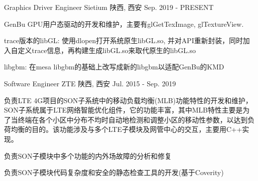 
\begin{cventries}
  \cventry
    {Graphics Driver Engineer} %
    {Sietium} %
    {陕西, 西安} %
    {Sep. 2019 - PRESENT} %
    {
      \begin{cvitems} %
        \item {GenBu GPU用户态驱动的开发和维护，主要有glGetTexImage, glTextureView.}
        \item {trace版本的libGL: 使用dlopen打开系统原生libGL.so, 并对API重新封装，同时加入自定义trace信息，再构建生成libGL.so来取代原生的libGL.so}
        \item {libgbm: 在mesa libgbm的基础上改写成新的libgbm以适配GenBu的KMD}
      \end{cvitems}
    }

  \cventry
    {Software Engineer} %
    {ZTE} %
    {陕西, 西安} %
    {Jul. 2015 - Sep. 2019} %
    {
      \begin{cvitems} %
        \item {负责LTE 4G项目的SON子系统中的移动负载均衡(MLB)功能特性的开发和维护，SON子系统属于LTE网络智能优化组件，它的功能丰富，其中MLB特性主要是为了当终端在各个小区中分布不均时自动地检测和调整小区的移动性参数，以达到负荷均衡的目的。该功能涉及与多个LTE子模块及网管中心的交互，主要用C++实现。}
		\item {负责SON子模块中多个功能的内外场故障的分析和修复}
        \item {负责SON子模块代码复杂度和安全的静态检查工具的开发(基于Coverity)}
      \end{cvitems}
    }
\end{cventries}
